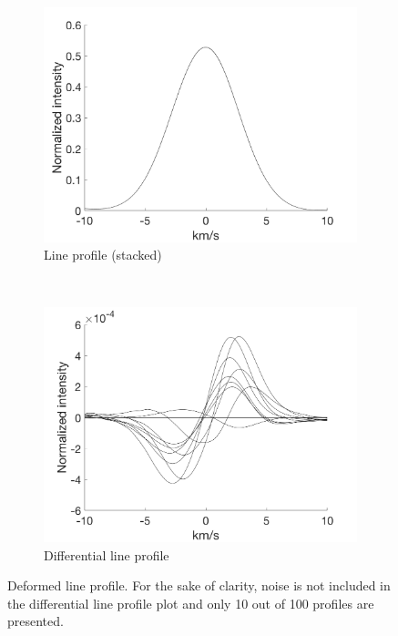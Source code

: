 \begin{figure}[tbp]
    \begin{subfigure}[b]{0.49\textwidth}
        \includegraphics[width=\textwidth]{./Figures/Methods/LPD1-Line_Profile.png}
        \caption{Line profile (stacked)}
    \end{subfigure}
	~
    \begin{subfigure}[b]{0.49\textwidth}
        \includegraphics[width=\textwidth]{./Figures/Methods/LPD1-Differential_line_Profile.png}
        \caption{Differential line profile}
        \label{fig:ld_dlp}
    \end{subfigure}	
    
    \caption[Deformed line profile]{Deformed line profile. For the sake of clarity, noise is not included in  
    the differential line profile plot and only 10 out of 100 profiles are presented.}
\label{fig:line_profiles_deformation}
\end{figure}	

